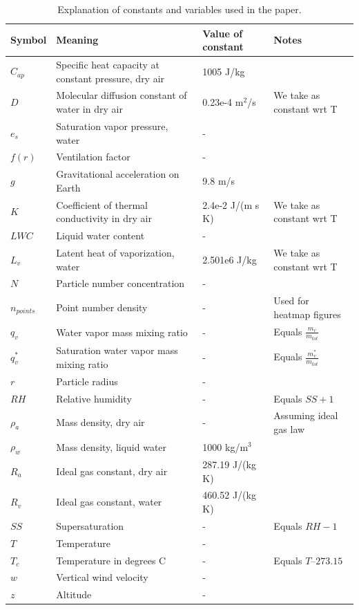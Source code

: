 \documentclass{article}
\begin{document}
\begin{table}
\centering
\begin{tabular}{@{}llll@{}}
\toprule
Symbol & Meaning & Value of constant & Notes \\ \midrule
$C_{ap}$ & Specific heat capacity at constant pressure, dry air & 1005 J/kg &  \\
$D$ & Molecular diffusion constant of water in dry air & 0.23e-4 m$^2$/s & We take as constant wrt T \\
$e_s$ & Saturation vapor pressure, water & - &  \\
$f(r)$ & Ventilation factor & - &  \\
$g$ & Gravitational acceleration on Earth & 9.8 m/s &  \\
$K$ & Coefficient of thermal conductivity in dry air & 2.4e-2 J/(m s K) & We take as constant wrt T \\
$LWC$ & Liquid water content & - &  \\
$L_v$ & Latent heat of vaporization, water & 2.501e6 J/kg & We take as constant wrt T \\
$N$ & Particle number concentration & - &  \\
$n_{points}$ & Point number density & - & Used for heatmap figures \\
$q_v$ & Water vapor mass mixing ratio & - & Equals $\frac{m_v}{m_{tot}}$ \\
$q_v^*$ & Saturation water vapor mass mixing ratio & - & Equals $\frac{m_v^*}{m_{tot}}$ \\
$r$ & Particle radius & - &  \\
$RH$ & Relative humidity & - & Equals $SS+1$ \\
$\rho_a$ & Mass density, dry air & - & Assuming ideal gas law \\
$\rho_w$ & Mass density, liquid water & 1000 kg/m$^3$ &  \\
$R_a$ & Ideal gas constant, dry air & 287.19 J/(kg K) &  \\
$R_v$ & Ideal gas constant, water & 460.52 J/(kg K) &  \\
$SS$ & Supersaturation & - & Equals $RH-1$ \\
$T$ & Temperature & - &  \\
$T_c$ & Temperature in degrees C & - & Equals $T – 273.15$ \\
$w$ & Vertical wind velocity & - &  \\
$z$ & Altitude & - &  \\ \bottomrule
\end{tabular}
\caption{Explanation of constants and variables used in the paper.}
\label{vartable}
\end{table}

\clearpage
\newpage



\end{document}
